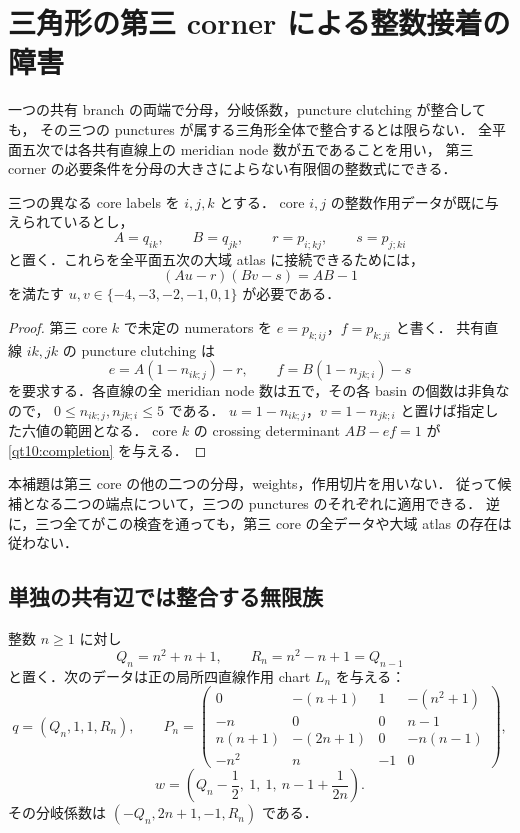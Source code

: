\section{三角形の第三 corner による整数接着の障害}
\label{qt10:section}

一つの共有 branch の両端で分母，分岐係数，puncture clutching が整合しても，
その三つの punctures が属する三角形全体で整合するとは限らない．
全平面五次では各共有直線上の meridian node 数が五であることを用い，
第三 corner の必要条件を分母の大きさによらない有限個の整数式にできる．

\begin{lemma}\label{qt10:third-corner}
三つの異なる core labels を $i,j,k$ とする．
core $i,j$ の整数作用データが既に与えられているとし，
\[
 A=q_{ik},\qquad B=q_{jk},\qquad
 r=p_{i;kj},\qquad s=p_{j;ki}
\]
と置く．これらを全平面五次の大域 atlas に接続できるためには，
\begin{equation}\label{qt10:completion}
 (Au-r)(Bv-s)=AB-1
\end{equation}
を満たす $u,v\in\{-4,-3,-2,-1,0,1\}$ が必要である．
\end{lemma}

\begin{proof}
第三 core $k$ で未定の numerators を
$e=p_{k;ij}$，$f=p_{k;ji}$ と書く．
共有直線 $ik,jk$ の puncture clutching は
\[
 e=A(1-n_{ik;j})-r,\qquad
 f=B(1-n_{jk;i})-s
\]
を要求する．各直線の全 meridian node 数は五で，その各 basin の個数は非負なので，
$0\le n_{ik;j},n_{jk;i}\le5$ である．
$u=1-n_{ik;j}$，$v=1-n_{jk;i}$ と置けば指定した六値の範囲となる．
core $k$ の crossing determinant $AB-ef=1$ が \eqref{qt10:completion} を与える．
\end{proof}

本補題は第三 core の他の二つの分母，weights，作用切片を用いない．
従って候補となる二つの端点について，三つの punctures のそれぞれに適用できる．
逆に，三つ全てがこの検査を通っても，第三 core の全データや大域 atlas の存在は従わない．

\subsection{単独の共有辺では整合する無限族}

\begin{proposition}[隣接する二高分母の局所族]\label{qt10:ladder-family}
整数 $n\ge1$ に対し
\[
 Q_n=n^2+n+1,\qquad R_n=n^2-n+1=Q_{n-1}
\]
と置く．次のデータは正の局所四直線作用 chart $L_n$ を与える：
\[
 q=(Q_n,1,1,R_n),\qquad
 P_n=\begin{pmatrix}
 0&-(n+1)&1&-(n^2+1)\\
 -n&0&0&n-1\\
 n(n+1)&-(2n+1)&0&-n(n-1)\\
 -n^2&n&-1&0
 \end{pmatrix},
\]
\[
 w=\left(Q_n-\frac12,\ 1,\ 1,\ n-1+\frac1{2n}\right).
\]
その分岐係数は $(-Q_n,2n+1,-1,R_n)$ である．
\end{proposition}

